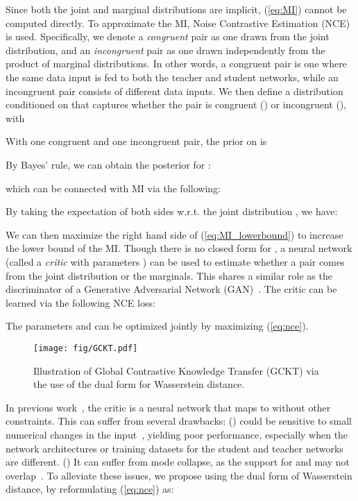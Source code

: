 \documentclass[final]{cvpr}
\theoremstyle{definition}
\begin{document}
Since both the joint and marginal distributions are implicit, (\ref{eq:MI}) cannot be computed directly. To approximate the MI, Noise Contrastive Estimation (NCE)~\cite{gutmann2010noise} is used. Specifically,
we denote a \textit{congruent} pair as one drawn from the joint distribution, and an \textit{incongruent} pair as one drawn independently from the product of marginal distributions.
In other words, a congruent pair is one where the same data input is fed to both the teacher and student networks, while an incongruent pair consists of different data inputs. 
We then define a distribution  conditioned on  that captures whether the pair is congruent () or incongruent (), with 

With one congruent and one incongruent pair,
the prior on  is 

By Bayes' rule, we can obtain the posterior for :

which can be connected with MI via the following:

By taking the expectation of both sides w.r.t. the joint distribution , we have:



We can then maximize the right hand side of (\ref{eq:MI_lowerbound}) to increase the lower bound of the MI.
Though there is no closed form for , a neural network  (called a \emph{critic} with parameters ) can be used to estimate whether a pair comes from the joint distribution or the marginals. 
This shares a similar role as the discriminator of a Generative Adversarial Network (GAN)~\cite{goodfellow2014generative}.
The critic  can be learned via the following NCE loss:

The parameters  and  can be optimized jointly by maximizing (\ref{eq:nce}).

\begin{figure}[!t]
    \centering
    \texttt{[image: fig/GCKT.pdf]}
    \vspace{-5mm}
    \caption{\small\label{fig:wnce_framework} Illustration of Global Contrastive Knowledge Transfer (GCKT) via the use of the dual form for Wasserstein distance.}
    \vspace{-3mm}
\end{figure}

In previous work~\cite{tian2019contrastive}, the critic  is a neural network that maps  to  without other constraints. This can suffer from several drawbacks: ()  could be sensitive to small numerical changes in the input~\cite{tian2019contrastive, ozair2019wasserstein}, yielding poor performance, especially when the network architectures or training datasets for the student and teacher networks are different. 
() It can suffer from mode collapse, as the support for  and  may not overlap~\cite{wgan}. To alleviate these issues,
we propose using the dual form of Wasserstein distance, by reformulating
(\ref{eq:nce}) as: 
\end{document}
